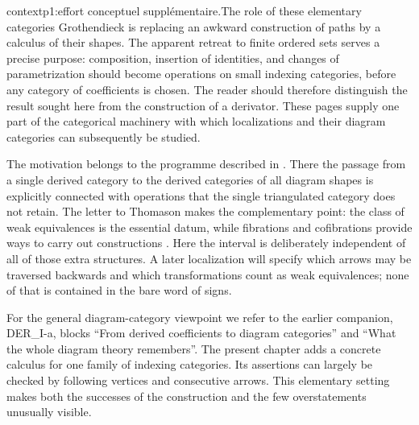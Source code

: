 
\begin{dcomment}{context}{p1:effort conceptuel supplémentaire.}{The role of these elementary categories}
Grothendieck is replacing an awkward construction of paths by a calculus of their shapes. The apparent retreat to finite ordered sets serves a precise purpose: composition, insertion of identities, and changes of parametrization should become operations on small indexing categories, before any category of coefficients is chosen. The reader should therefore distinguish the result sought here from the construction of a derivator. These pages supply one part of the categorical machinery with which localizations and their diagram categories can subsequently be studied.

The motivation belongs to the programme described in \citet[\S69, pp.~1--3]{Grothendieck1983}. There the passage from a single derived category to the derived categories of all diagram shapes is explicitly connected with operations that the single triangulated category does not retain. The letter to Thomason makes the complementary point: the class of weak equivalences is the essential datum, while fibrations and cofibrations provide ways to carry out constructions \citep[\S1]{Grothendieck1991Letter}. Here the interval is deliberately independent of all of those extra structures. A later localization will specify which arrows may be traversed backwards and which transformations count as weak equivalences; none of that is contained in the bare word of signs.

For the general diagram-category viewpoint we refer to the earlier companion, DER\_I-a, blocks ``From derived coefficients to diagram categories'' and ``What the whole diagram theory remembers''. The present chapter adds a concrete calculus for one family of indexing categories. Its assertions can largely be checked by following vertices and consecutive arrows. This elementary setting makes both the successes of the construction and the few overstatements unusually visible.
\end{dcomment}


